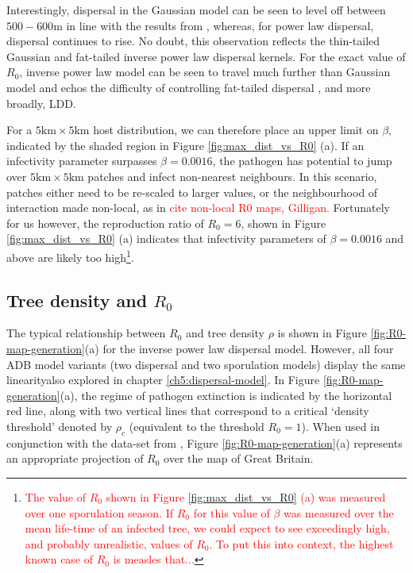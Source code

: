 Interestingly, dispersal in the Gaussian model can be seen to level off between $500-600\mathrm{m}$ in line with the results from \cite{grosdidier2018tracking}, whereas, for power law dispersal, dispersal continues to rise. No doubt, this observation reflects the thin-tailed Gaussian and fat-tailed inverse power law dispersal kernels. For the exact value of $R_0$, inverse power law model can be seen to travel much further than Gaussian model and echos the difficulty of controlling fat-tailed dispersal \cite{WEBIDEMICS}, and more broadly, LDD.

For a $5\mathrm{km} \times 5 \mathrm{km}$ host distribution, we can therefore place an upper limit on $\beta$, indicated by the shaded region in Figure \ref{fig:max_dist_vs_R0} (a). If an infectivity parameter surpasses $\beta = 0.0016$, the pathogen has potential to jump over $5\mathrm{km} \times 5 \mathrm{km}$ patches and infect non-nearest neighbours. In this scenario, patches either need to be re-scaled to larger values, or the neighbourhood of interaction made non-local, as in \textcolor{red}{cite non-local R0 maps, Gilligan.} Fortunately for us however, the reproduction ratio of $R_0=6$, shown in Figure \ref{fig:max_dist_vs_R0} (a) indicates that infectivity parameters of $\beta = 0.0016$ and above are likely too high\footnote{\textcolor{red}{The value of $R_0$ shown in Figure \ref{fig:max_dist_vs_R0} (a) was measured over one sporulation season. If $R_0$ for this value of $\beta$ was measured over the mean life-time of an infected tree, we could expect to see exceedingly high, and probably unrealistic, values of $R_0$. To put this into context, the highest known case of $R_0$ is measles that...}}.

\subsection{Tree density and $R_0$}

The typical relationship between $R_0$ and tree density $\rho$ is shown in Figure \ref{fig:R0-map-generation}(a) for the inverse power law dispersal model. However, all four ADB model variants (two dispersal and two sporulation models) display the same linearity\textemdash also explored in chapter \ref{ch5:dispersal-model}. In Figure \ref{fig:R0-map-generation}(a), the regime of pathogen extinction is indicated by the horizontal red line, along with two vertical lines that correspond to a critical `density threshold' denoted by $\rho_c$ (equivalent to the threshold $R_0 = 1$). When used in conjunction with the data-set from \cite{hill.data}, Figure \ref{fig:R0-map-generation}(a) represents an appropriate projection of $R_0$ over the map of Great Britain.

